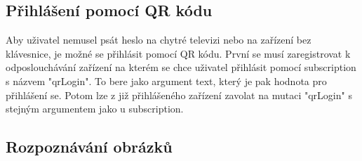 \subsection{Přihlášení pomocí QR kódu}
Aby uživatel nemusel psát heslo na chytré televizi nebo na zařízení bez klávesnice, je možné se přihlásit pomocí QR kódu. První se musí zaregistrovat k odposlouchávání zařízení na kterém se chce uživatel přihlásit pomocí subscription s názvem "qrLogin". To bere jako argument text, který je pak hodnota pro přihlášení se. Potom lze z již přihlášeného zařízení zavolat na mutaci "qrLogin" s stejným argumentem jako u subscription.

\subsection{Rozpoznávání obrázků}